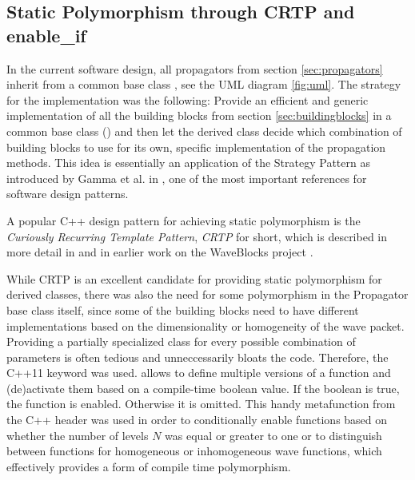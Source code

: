 \subsection{Static Polymorphism through CRTP and enable\_if}
\label{subsec:poly}
%
In the current software design, all propagators from section \ref{sec:propagators} inherit from a common base class , see the UML diagram \ref{fig:uml}.
The strategy for the implementation was the following:
Provide an efficient and generic implementation of all the building blocks from section \ref{sec:buildingblocks} in a common base class () and then let the derived class decide which combination of building blocks to use for its own, specific implementation of the propagation methods.
This idea is essentially an application of the Strategy Pattern as introduced by Gamma et al. in \cite{Gamma1995}, one of the most important references for software design patterns.
\par\medskip
%
A popular C++ design pattern for achieving static polymorphism is the \emph{Curiously Recurring Template Pattern}, \emph{CRTP} for short, which is described in more detail in \cite{C_CRTP} and in earlier work on the WaveBlocks project \cite{libwaveblocks}.
\par\medskip
%
While CRTP is an excellent candidate for providing static polymorphism for derived classes, there was also the need for some polymorphism in the Propagator base class itself, since some of the building blocks need to have different implementations based on the dimensionality or homogeneity of the wave packet. 
Providing a partially specialized class for every possible combination of parameters is often tedious and unneccessarily bloats the code.
Therefore, the C++11  keyword was used.
 allows to define multiple versions of a function and (de)activate them based on a compile-time boolean value.
If the boolean is true, the function is enabled. Otherwise it is omitted.
This handy metafunction from the C++  header was used in order to conditionally enable functions based on whether the number of levels $N$ was equal or greater to one or to distinguish between functions for homogeneous or inhomogeneous wave functions, which effectively provides a form of compile time polymorphism.
%
